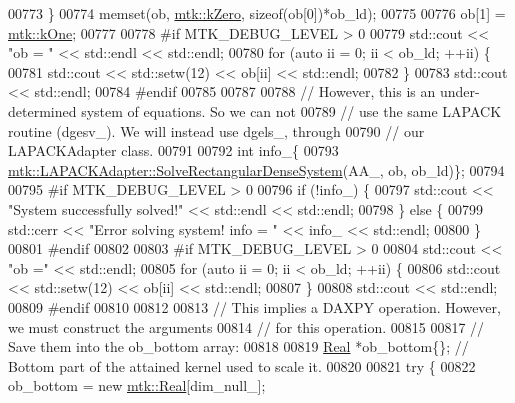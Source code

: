 \begin{DoxyCode}
{{00773     \}
00774     memset(ob, \hyperlink{group__c01-roots_ga59a451a5fae30d59649bcda274fea271}{mtk::kZero}, \textcolor{keyword}{sizeof}(ob[0])*ob\_ld);
00775 
00776     ob[1] = \hyperlink{group__c01-roots_ga26407c24d43b6b95480943340d285c71}{mtk::kOne};
00777 
00778 \textcolor{preprocessor}{    #if MTK\_DEBUG\_LEVEL > 0}
00779     std::cout << \textcolor{stringliteral}{"ob = "} << std::endl << std::endl;
00780     \textcolor{keywordflow}{for} (\textcolor{keyword}{auto} ii = 0; ii < ob\_ld; ++ii) \{
00781       std::cout << std::setw(12) << ob[ii] << std::endl;
00782     \}
00783     std::cout << std::endl;
00784 \textcolor{preprocessor}{    #endif}
00785 
00787 
00788     \textcolor{comment}{// However, this is an under-determined system of equations. So we can not}
00789     \textcolor{comment}{// use the same LAPACK routine (dgesv\_). We will instead use dgels\_, through}
00790     \textcolor{comment}{// our LAPACKAdapter class.}
00791 
00792     \textcolor{keywordtype}{int} info\_\{
00793       \hyperlink{classmtk_1_1LAPACKAdapter_a380f148ffdf96bae2f79ae28f1a6560c}{mtk::LAPACKAdapter::SolveRectangularDenseSystem}(AA\_, 
      ob, ob\_ld)\};
00794 
00795 \textcolor{preprocessor}{    #if MTK\_DEBUG\_LEVEL > 0}
00796     \textcolor{keywordflow}{if} (!info\_) \{
00797       std::cout << \textcolor{stringliteral}{"System successfully solved!"} << std::endl << std::endl;
00798     \} \textcolor{keywordflow}{else} \{
00799       std::cerr << \textcolor{stringliteral}{"Error solving system! info = "} << info\_ << std::endl;
00800     \}
00801 \textcolor{preprocessor}{    #endif}
00802 
00803 \textcolor{preprocessor}{    #if MTK\_DEBUG\_LEVEL > 0}
00804     std::cout << \textcolor{stringliteral}{"ob ="} << std::endl;
00805     \textcolor{keywordflow}{for} (\textcolor{keyword}{auto} ii = 0; ii < ob\_ld; ++ii) \{
00806       std::cout << std::setw(12) << ob[ii] << std::endl;
00807     \}
00808     std::cout << std::endl;
00809 \textcolor{preprocessor}{    #endif}
00810 
00812 
00813     \textcolor{comment}{// This implies a DAXPY operation. However, we must construct the arguments}
00814     \textcolor{comment}{// for this operation.}
00815 
00817     \textcolor{comment}{// Save them into the ob\_bottom array:}
00818 
00819     \hyperlink{group__c01-roots_gac080bbbf5cbb5502c9f00405f894857d}{Real} *ob\_bottom\{\}; \textcolor{comment}{// Bottom part of the attained kernel used to scale it.}
00820 
00821     \textcolor{keywordflow}{try} \{
00822       ob\_bottom = \textcolor{keyword}{new} \hyperlink{group__c01-roots_gac080bbbf5cbb5502c9f00405f894857d}{mtk::Real}[dim\_null\_];
}}
\end{DoxyCode}
